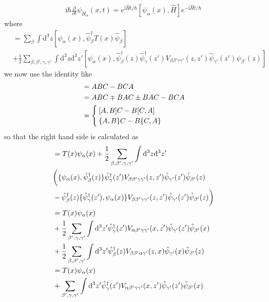 \begin{align}
\mathrm{i}\hbar \frac{\partial}{\partial t} \psi_{H_{\alpha}}(x,t)=e^{\mathrm{i}\hat Ht/\hbar}[\psi_{\alpha}(x),\hat H]e^{-\mathrm{i}\hat Ht/\hbar} \nonumber
\end{align}
where
\begin{align}
[\psi_{\alpha}(x),\hat H]&=\sum_{\beta} \int \mathrm{d}^3z[\psi_{\alpha}(x),\hat \psi^{\dagger}_{\beta}T(x)\hat \psi_{\beta}] \nonumber \\
&+\frac{1}{2}\sum_{\beta,\beta',\gamma,\gamma'}\int \mathrm{d}^3z\mathrm{d}^3z'[\psi_{\alpha}(x),
\hat \psi^{\dagger}_{\beta}(z)\hat \psi^{\dagger}_{\gamma}(z')V_{\beta\beta'\gamma\gamma'}(z,z')\hat \psi_{\gamma'}(z')\hat \psi_{\beta'}(z)
] \nonumber
\end{align}
we now use the identity like
\begin{align}
[A,BC]&=ABC-BCA \nonumber \\	
&=ABC\mp BAC\pm BAC -BCA \nonumber \\
&=\begin{cases}
[A,B]C-B[C,A] \cr \{A,B\}C-B\{C,A\}
\end{cases}\nonumber
\end{align}
so that the right hand side is calculated as
\begin{align}
[\psi_{\alpha}(x),\hat H]&=T(x)\psi_{\alpha}(x)+\frac{1}{2}\sum_{\beta,\beta',\gamma,\gamma'}\int \mathrm{d}^3z\mathrm{d}^3z'
\nonumber \\
&\bigg{(}\{\psi_{\alpha}(x),
\hat \psi^{\dagger}_{\beta}(z)\}\hat \psi^{\dagger}_{\gamma}(z')V_{\beta\beta'\gamma\gamma'}(z,z')\hat \psi_{\gamma'}(z')\hat \psi_{\beta'}(z)\nonumber \\
&-\hat \psi^{\dagger}_{\beta}(z)\{\hat \psi^{\dagger}_{\gamma}(z'),\psi_{\alpha}(x)\}V_{\beta\beta'\gamma\gamma'}(z,z')\hat \psi_{\gamma'}(z')\hat \psi_{\beta'}(z) \bigg{)}\nonumber \\
&=T(x)\psi_{\alpha}(x)\nonumber \\
&+\frac{1}{2}\sum_{\beta',\gamma,\gamma'}\int \mathrm{d}^3z'\hat \psi^{\dagger}_{\gamma}(z')V_{\alpha\beta'\gamma\gamma'}(x,z')\hat \psi_{\gamma'}(z')\hat \psi_{\beta'}(x) \nonumber\\
&+\frac{1}{2}\sum_{\beta,\beta',\gamma'}\int \mathrm{d}^3z'\hat \psi^{\dagger}_{\beta}(z)V_{\beta\beta'\alpha\gamma'}(z,x)\hat \psi_{\gamma'}(x)\hat \psi_{\beta'}(z) \nonumber\\
&=T(x)\psi_{\alpha}(x) \nonumber \\
&+\sum_{\beta',\gamma,\gamma'}\int \mathrm{d}^3z'\hat \psi^{\dagger}_{\gamma}(z')V_{\alpha\beta'\gamma\gamma'}(x,z')\hat \psi_{\gamma'}(z')\hat \psi_{\beta'}(x) \nonumber
\end{align}
